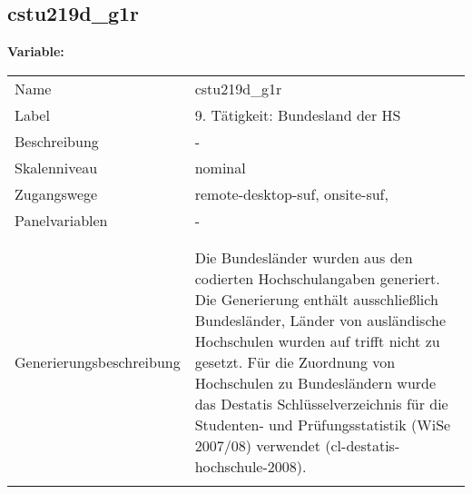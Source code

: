 	
	
	\subsection{cstu219d\_g1r}
	\label{subSection:cstu219d_g1r}

	\noindent\textbf{Variable:}\\
		\begin{tabular}{lL{11.3cm}}
			\label{tableVariable:cstu219d_g1r}
			Name & cstu219d\_g1r \\
			Label & 9. Tätigkeit: Bundesland der HS \\
			Beschreibung & - \\
			Skalenniveau & nominal \\
			Zugangswege &
				remote-desktop-suf,
				onsite-suf,
 \\
			Panelvariablen & -
			 \\
			 \\
 \\
					Generierungsbeschreibung & Die Bundesländer wurden aus den codierten Hochschulangaben generiert. Die Generierung enthält ausschließlich Bundesländer, Länder von ausländische Hochschulen wurden auf trifft nicht zu gesetzt. Für die Zuordnung von Hochschulen zu Bundesländern wurde das Destatis Schlüsselverzeichnis für die Studenten- und Prüfungsstatistik (WiSe 2007/08) verwendet (cl-destatis-hochschule-2008).
				 \\	
			 \\
		\end{tabular}






